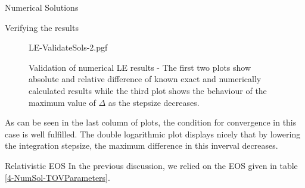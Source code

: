 \begin{section}{Numerical Solutions}
\begin{subsection}{Verifying the results}
\begin{figure}[H]
	\centering
	{LE-ValidateSols-2.pgf}
	\caption[Validation of numerical LE results]{Validation of numerical \ac{LE} results - The first two plots show absolute and relative difference of known exact and numerically calculated results while the third plot shows the behaviour of the maximum value of $\Delta$ as the stepsize decreases.}
	\label{4-NumSol-ValidateLEResults}
\end{figure}\noindent
As can be seen in the last column of plots, the condition for convergence in this case is well fulfilled. 
The double logarithmic plot displays nicely that by lowering the integration stepsize, the maximum difference in this inverval decreases.
% 
\end{subsection}
%
%
\begin{subsection}{Relativistic EOS}
In the previous discussion, we relied on the EOS given in table \ref{4-NumSol-TOVParameters}. 

\end{subsection}
\end{section}
